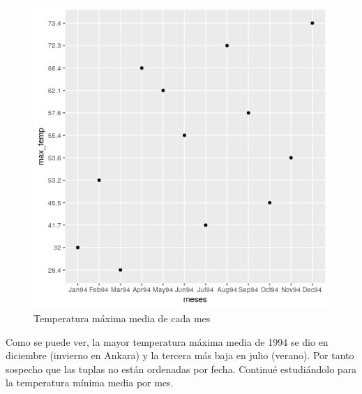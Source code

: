 \begin{figure}[H] %
	\centering
	\includegraphics[scale=0.7]{div1.png}  %
	\caption{Temperatura máxima media de cada mes} 
	\label{fig:div1}
\end{figure}

Como se puede ver, la mayor temperatura máxima media de 1994 se dio en diciembre (invierno en Ankara) y la tercera más baja en julio (verano). Por tanto sospecho que las tuplas no están ordenadas por fecha. Continué estudiándolo para la temperatura mínima media por mes.

